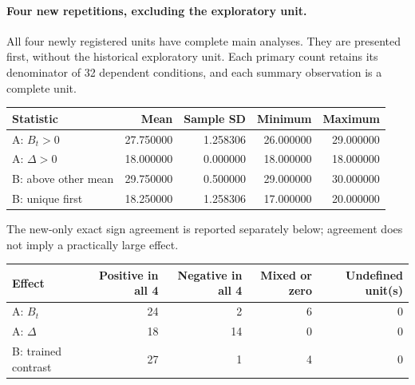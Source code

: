 \paragraph{Four new repetitions, excluding the exploratory unit.}
All four newly registered units have complete main analyses. They are presented first, without the historical exploratory unit. Each primary count retains its denominator of 32 dependent conditions, and each summary observation is a complete unit.
\begin{center}\small\begin{tabular}{lrrrr}\toprule
Statistic & Mean & Sample SD & Minimum & Maximum\\\midrule
A: $B_t>0$ & 27.750000 & 1.258306 & 26.000000 & 29.000000\\
A: $\Delta>0$ & 18.000000 & 0.000000 & 18.000000 & 18.000000\\
B: above other mean & 29.750000 & 0.500000 & 29.000000 & 30.000000\\
B: unique first & 18.250000 & 1.258306 & 17.000000 & 20.000000\\
\bottomrule\end{tabular}\end{center}
The new-only exact sign agreement is reported separately below; agreement does not imply a practically large effect.
\begin{center}\small\begin{tabular}{lrrrr}\toprule
Effect & Positive in all 4 & Negative in all 4 & Mixed or zero & Undefined unit(s)\\\midrule
A: $B_t$ & 24 & 2 & 6 & 0\\
A: $\Delta$ & 18 & 14 & 0 & 0\\
B: trained contrast & 27 & 1 & 4 & 0\\
\bottomrule\end{tabular}\end{center}
